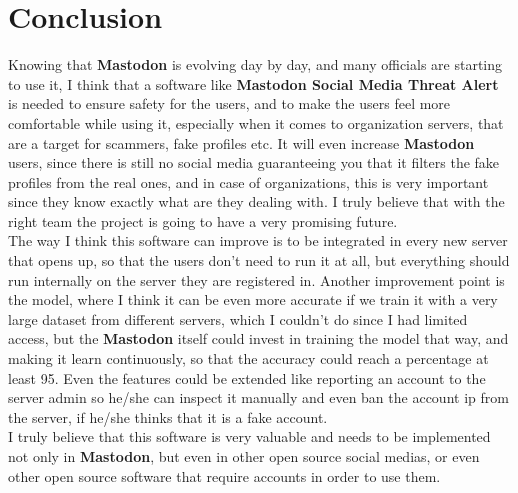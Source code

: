 \chapter{Conclusion}
\label{ch:sum}

Knowing that \textbf{Mastodon} is evolving day by day, and many officials are starting to use it, I think that a software
like \textbf{Mastodon Social Media Threat Alert} is needed to ensure safety for the users, and to make the users feel more
comfortable while using it, especially when it comes to organization servers, that are a target for scammers, fake profiles etc.
It will even increase \textbf{Mastodon} users, since there is still no social media guaranteeing you that it filters the fake profiles
from the real ones, and in case of organizations, this is very important since they know exactly what are they dealing with.
I truly believe that with the right team the project is going to have a very promising future.
\\[5pt]
The way I think this software can improve is to be integrated in every new server that opens up, so that the users don't
need to run it at all, but everything should run internally on the server they are registered in.
Another improvement point is the model, where I think it can be even more accurate if we train it with a very large dataset from
different servers, which I couldn't do since I had limited access, but the \textbf{Mastodon} itself could invest in training the
model that way, and making it learn continuously, so that the accuracy could reach a percentage at least 95.
Even the features could be extended like reporting an account to the server admin so he/she can inspect it manually and even ban the
account ip from the server, if he/she thinks that it is a fake account.
\\[5pt]
I truly believe that this software is very valuable and needs to be implemented not only in \textbf{Mastodon}, but even in
other open source social medias, or even other open source software that require accounts in order to use them.
